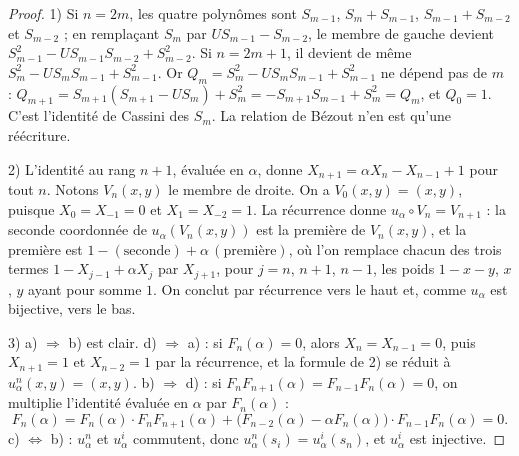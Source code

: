 \begin{proof}
1) Si $n = 2m$, les quatre polynômes sont $S_{m-1}$, $S_m + S_{m-1}$, $S_{m-1} + S_{m-2}$ et $S_{m-2}$ ; en remplaçant $S_m$ par $U S_{m-1} - S_{m-2}$, le membre de gauche devient $S_{m-1}^2 - U S_{m-1} S_{m-2} + S_{m-2}^2$. Si $n = 2m + 1$, il devient de même $S_m^2 - U S_m S_{m-1} + S_{m-1}^2$. Or $Q_m = S_m^2 - U S_m S_{m-1} + S_{m-1}^2$ ne dépend pas de $m$ : $Q_{m+1} = S_{m+1}(S_{m+1} - U S_m) + S_m^2 = -S_{m+1} S_{m-1} + S_m^2 = Q_m$, et $Q_0 = 1$. C'est l'identité de Cassini des $S_m$. La relation de Bézout n'en est qu'une réécriture.

2) L'identité au rang $n + 1$, évaluée en $\alpha$, donne $X_{n+1} = \alpha X_n - X_{n-1} + 1$ pour tout $n$. Notons $V_n(x, y)$ le membre de droite. On a $V_0(x, y) = (x, y)$, puisque $X_0 = X_{-1} = 0$ et $X_1 = X_{-2} = 1$. La récurrence donne $u_\alpha \circ V_n = V_{n+1}$ : la seconde coordonnée de $u_\alpha(V_n(x, y))$ est la première de $V_n(x, y)$, et la première est $1 - (\text{seconde}) + \alpha\,(\text{première})$, où l'on remplace chacun des trois termes $1 - X_{j-1} + \alpha X_j$ par $X_{j+1}$, pour $j = n$, $n + 1$, $n - 1$, les poids $1 - x - y$, $x$, $y$ ayant pour somme $1$. On conclut par récurrence vers le haut et, comme $u_\alpha$ est bijective, vers le bas.

3) a) $\Rightarrow$ b) est clair. d) $\Rightarrow$ a) : si $F_n(\alpha) = 0$, alors $X_n = X_{n-1} = 0$, puis $X_{n+1} = 1$ et $X_{n-2} = 1$ par la récurrence, et la formule de 2) se réduit à $u_\alpha^n(x, y) = (x, y)$. b) $\Rightarrow$ d) : si $F_n F_{n+1}(\alpha) = F_{n-1} F_n(\alpha) = 0$, on multiplie l'identité évaluée en $\alpha$ par $F_n(\alpha)$ :
\[ F_n(\alpha) = F_n(\alpha)\cdot F_nF_{n+1}(\alpha) + \bigl(F_{n-2}(\alpha) - \alpha F_n(\alpha)\bigr)\cdot F_{n-1}F_n(\alpha) = 0. \]
c) $\Leftrightarrow$ b) : $u_\alpha^n$ et $u_\alpha^i$ commutent, donc $u_\alpha^n(s_i) = u_\alpha^i(s_n)$, et $u_\alpha^i$ est injective.
\end{proof}


